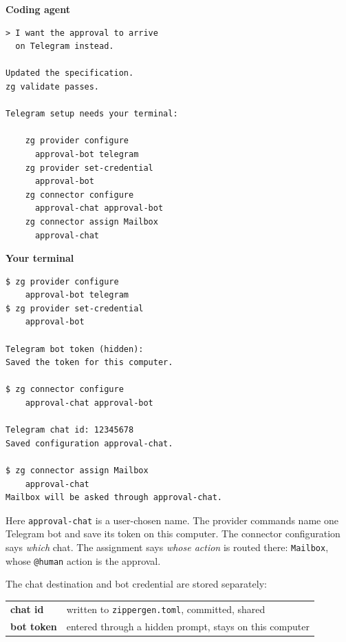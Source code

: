 \documentclass[11pt,a4paper]{article}
\begin{document}
\noindent
\begin{minipage}[t]{0.485\linewidth}
\textbf{\footnotesize Coding agent}\par\vspace{2pt}
\begin{lstlisting}[style=pane]
> I want the approval to arrive
  on Telegram instead.

Updated the specification.
zg validate passes.

Telegram setup needs your terminal:

    zg provider configure
      approval-bot telegram
    zg provider set-credential
      approval-bot
    zg connector configure
      approval-chat approval-bot
    zg connector assign Mailbox
      approval-chat
\end{lstlisting}
\end{minipage}\hfill
\begin{minipage}[t]{0.485\linewidth}
\textbf{\footnotesize Your terminal}\par\vspace{2pt}
\begin{lstlisting}[style=pane]
$ zg provider configure
    approval-bot telegram
$ zg provider set-credential
    approval-bot

Telegram bot token (hidden):
Saved the token for this computer.

$ zg connector configure
    approval-chat approval-bot

Telegram chat id: 12345678
Saved configuration approval-chat.

$ zg connector assign Mailbox
    approval-chat
Mailbox will be asked through approval-chat.
\end{lstlisting}
\end{minipage}
\par\smallskip

Here \texttt{approval-chat} is a user-chosen name.
The provider commands name one Telegram bot and save its token on this
computer. The connector configuration says \emph{which} chat. The assignment
says \emph{whose action} is routed there: \texttt{Mailbox}, whose
\texttt{@human} action is the approval.

The chat destination and bot credential are stored separately:

\begin{center}
\begin{tabularx}{0.92\linewidth}{@{}lX@{}}
\toprule
\textbf{chat id} & written to \texttt{zippergen.toml}, committed, shared \\
\textbf{bot token} & entered through a hidden prompt, stays on this computer \\
\bottomrule
\end{tabularx}
\end{center}
\end{document}
